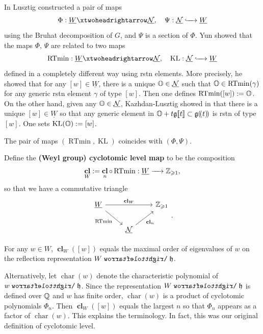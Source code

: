 \documentclass[reqno]{amsart}
\DeclareMathOperator{\RTmin}{RTmin}
\DeclareMathOperator{\KL}{KL}
\newcommand{\ubar}[1]{\underline{#1}}
\DeclareMathOperator{\cl}{\mathbf{cl}}
\newcommand{\laurent}[1]{(\!({\ensuremath{#1}})\!)}
\newcommand{\series}[1]{[\![{\ensuremath{#1}}]\!]}
\begin{document}
In \cite{Lusztig:Phi,Lusztig:Phi2} Lusztig constructed a pair of maps
\begin{equation*}
	\Phi: \ubar W \surjects \ubar \cN,\quad \Psi: \ubar \cN \injects \ubar W
\end{equation*}
using the Bruhat decomposition of $G$, and $\Psi$ is a section of $\Phi$. Yun \cite{Yun:RTmin} showed that the maps $\Phi$, $\Psi$ are related to two maps
\begin{equation*}
	\RTmin: \ubar W \surjects \ubar \cN,\quad \KL: \ubar \cN \injects \ubar W
\end{equation*}
defined in a completely different way using rstn elements. More precisely, he showed that for any $[w] \in \ubar W$, there is a unique $\BO \in \ubar \cN$ such that $\BO \in \RTmin(\gamma)$ for any generic rstn element $\gamma$ of type $[w]$. Then one defines $\RTmin([w]) := \BO$. On the other hand, given any $\BO \in \ubar \cN$, Kazhdan-Lusztig showed in \cite{KL:Fl} that there is a unique $[w] \in \ubar W$ so that any generic element in $\BO + t \fg\series{t} \subset \fg\laurent{t}$ is rstn of type $[w]$. One sets $\KL(\BO) := [w]$. 

\begin{theorem}
	The pair of maps $(\RTmin,\KL)$ coincides with $(\Phi,\Psi)$.
\end{theorem}

Define the \textbf{(Weyl group) cyclotomic level map} to be the composition
\begin{equation*}
	\cl_W := \cl_n \circ \RTmin: \ubar W \aro \BZ_{\ge 1},
\end{equation*}
so that we have a commutative triangle
\begin{equation*}
	\begin{tikzcd}
		\ubar W \ar[rr, "\cl_W"] \ar[dr, "\RTmin"']
		&& \BZ_{\ge 1}\\
		& \ubar \cN \ar[ur, "\cl_n"']
	\end{tikzcd}.
\end{equation*}

\begin{theorem}
	For any $w \in W$, $\cl_W([w])$ equals the maximal order of eigenvalues of $w$ on the reflection representation $W \acts \fh$. 
\end{theorem}

Alternatively, let $\operatorname{char}(w)$ denote the characteristic polynomial of $w \acts \fh$. Since the representation $W \acts \fh$ is defined over $\mathbb{Q}$ and $w$ has finite order, $\operatorname{char}(w)$ is a product of cyclotomic polynomials $\Phi_n$. Then $\cl_W([w])$ equals the largest $n$ so that $\Phi_n$ appears as a factor of $\operatorname{char}(w)$. This explains the terminology. In fact, this was our original definition of cyclotomic level.
\end{document}
